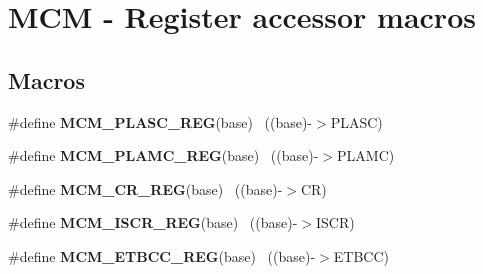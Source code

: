 \hypertarget{group___m_c_m___register___accessor___macros}{}\section{M\+C\+M -\/ Register accessor macros}
\label{group___m_c_m___register___accessor___macros}
\subsection*{Macros}
\begin{DoxyCompactItemize}
\item 
\hypertarget{group___m_c_m___register___accessor___macros_gad331cc7eeaf62bb3d0fc388993df2a8f}{}\#define {\bfseries M\+C\+M\+\_\+\+P\+L\+A\+S\+C\+\_\+\+R\+E\+G}(base)                                        ~((base)-\/$>$P\+L\+A\+S\+C)\label{group___m_c_m___register___accessor___macros_gad331cc7eeaf62bb3d0fc388993df2a8f}

\item 
\hypertarget{group___m_c_m___register___accessor___macros_ga56804c4b9f516c18d994d033cae1dc30}{}\#define {\bfseries M\+C\+M\+\_\+\+P\+L\+A\+M\+C\+\_\+\+R\+E\+G}(base)                                        ~((base)-\/$>$P\+L\+A\+M\+C)\label{group___m_c_m___register___accessor___macros_ga56804c4b9f516c18d994d033cae1dc30}

\item 
\hypertarget{group___m_c_m___register___accessor___macros_ga87cff4614e51fe78514025afa607e87c}{}\#define {\bfseries M\+C\+M\+\_\+\+C\+R\+\_\+\+R\+E\+G}(base)                                              ~((base)-\/$>$C\+R)\label{group___m_c_m___register___accessor___macros_ga87cff4614e51fe78514025afa607e87c}

\item 
\hypertarget{group___m_c_m___register___accessor___macros_ga1e9bb7eeb7b96f4996c4ad455d09ab12}{}\#define {\bfseries M\+C\+M\+\_\+\+I\+S\+C\+R\+\_\+\+R\+E\+G}(base)                                          ~((base)-\/$>$I\+S\+C\+R)\label{group___m_c_m___register___accessor___macros_ga1e9bb7eeb7b96f4996c4ad455d09ab12}

\item 
\hypertarget{group___m_c_m___register___accessor___macros_gab88a04ecfdb01a192fb627f315a66abb}{}\#define {\bfseries M\+C\+M\+\_\+\+E\+T\+B\+C\+C\+\_\+\+R\+E\+G}(base)                                        ~((base)-\/$>$E\+T\+B\+C\+C)\label{group___m_c_m___register___accessor___macros_gab88a04ecfdb01a192fb627f315a66abb}


\end{DoxyCompactItemize}
